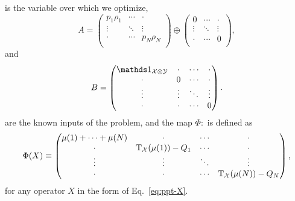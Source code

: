 is the variable over which we optimize,
\begin{equation}
  A = \begin{pmatrix}
      p_{1}\rho_{1} & \cdots & \cdot\\
      \vdots & \ddots & \vdots\\
      \cdot & \cdots & p_{N}\rho_{N}\\
  \end{pmatrix}
  \oplus
  \begin{pmatrix}
      0 & \cdots & \cdot\\
      \vdots & \ddots & \vdots\\
      \cdot & \cdots & 0\\
  \end{pmatrix},
\end{equation}
and
\begin{equation}  
  B = 
  \begin{pmatrix}
      \I_{\X\otimes\Y} & \cdot & \cdots & \cdot \\
        \cdot  & 0 & \cdots & \cdot\\
        \vdots & \vdots & \ddots & \vdots\\
        \cdot  & \cdot & \cdots & 0
    \end{pmatrix}.
\end{equation}
are the known inputs of the problem, and the map $\Phi : $ is defined as 
\begin{equation}
  \Phi(X) \equiv \begin{pmatrix}
      \mu(1) + \cdots +\mu(N) & \cdot & \cdots & \cdot \\
        \cdot  & \operatorname{T}_{\mathcal{X}}(\mu(1)) - Q_{1} & \cdots & \cdot\\
        \vdots &\vdots & \ddots & \vdots\\
        \cdot  &\cdot & \cdots & \operatorname{T}_{\mathcal{X}}(\mu(N)) - Q_{N}
    \end{pmatrix},
\end{equation}
for any operator $X$ in the form of Eq.~\eqref{eq:ppt-X}.

